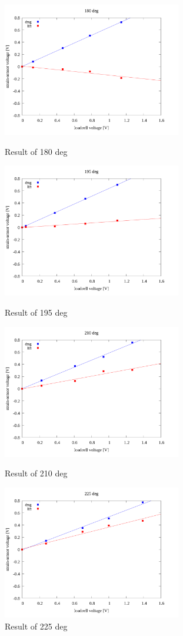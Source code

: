 \documentclass[twocolumn,a4j]{jsarticle}
\begin{document}
\par
\newpage

\begin{figure}[htbp]
    \footnotesize
    \begin{center}
        \includegraphics[width=78mm]{../images/linear/180_linear.png}
        \caption{Result of 180 deg}
        \includegraphics[width=78mm]{../images/linear/195_linear.png}
        \caption{Result of 195 deg}
        \includegraphics[width=78mm]{../images/linear/210_linear.png}
        \caption{Result of 210 deg}
        \includegraphics[width=78mm]{../images/linear/225_linear.png}
        \caption{Result of 225 deg}
    \end{center}
\end{figure}
\end{document}
